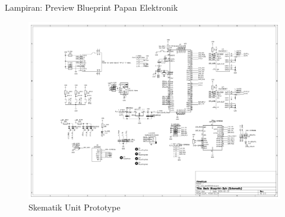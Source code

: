 \documentclass[12pt,a4paper,landscape]{article}
\begin{document}
\begin{table}[H]
\begin{center}
\begin{tabular}{|p{3cm}|c|p{4cm}|c|p{4cm}|}
				\bottomrule
			\end{tabular}
		\end{center}
	\end{table}
	
	\newpage
	\Large{Lampiran: Preview Blueprint Papan Elektronik}
	\begin{figure}[!ht]
		\centering
		\includegraphics[width=0.8\linewidth]{images/blueprint/skema}
		\caption{Skematik Unit Prototype}
	\end{figure}
	\newpage
	
\end{document}
